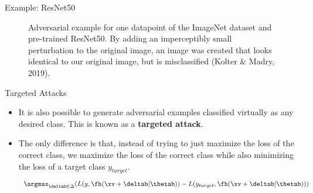 \begin{frame} {Example: ResNet50}
  \begin{figure}
    \centering
     \vspace{-0.2cm}
      \caption{Adversarial example for one datapoint of the ImageNet dataset and pre-trained ResNet50. By adding an imperceptibly small perturbation to the original image,  an image was created that looks identical to our original image, but is misclassified (Kolter \& Madry, 2019).}
  \end{figure}
\end{frame}

\begin{frame}{Targeted Attacks}
    \begin{itemize}
        \item It is also possible to generate adversarial examples classified virtually as any desired class. This is known as a \textbf{targeted attack}.
        \item The only difference is that, instead of trying to just maximize the loss of the correct class, we maximize the loss of the correct class while also minimizing the loss of a target class $y_{target}$.
        \begin{equation*}
             \argmax_{\deltab \in \Delta} ( L(y, \fh(\xv + \deltab| \thetab)) - L(y_{target}, \fh(\xv + \deltab| \thetab)) )
        \end{equation*}
    \end{itemize}
\end{frame}
  
